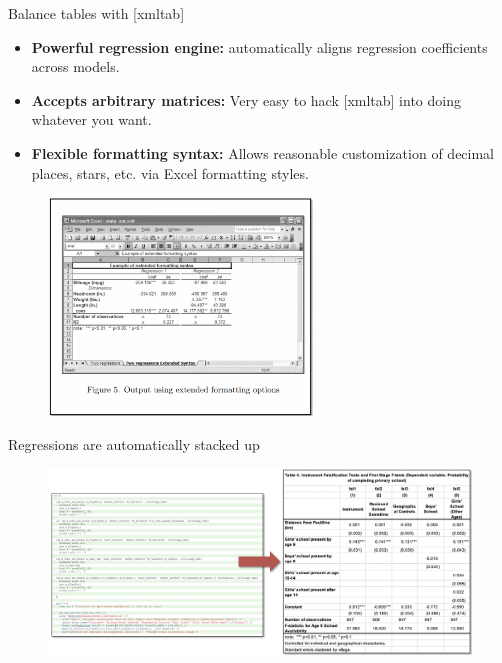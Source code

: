 \documentclass[aspectratio=169]{beamer}
\begin{document}
\begin{frame}{Balance tables with [xmltab]}
	\begin{multicols}{2}	
		
		\begin{itemize}[<default overlay specification>]
			\item<1> \textbf{Powerful regression engine:} automatically aligns regression coefficients across models.
			\item<1> \textbf{Accepts arbitrary matrices:} Very easy to hack [xmltab] into doing whatever you want. 
			\item<1> \textbf{Flexible formatting syntax:} Allows reasonable customization of decimal places, stars, etc. via Excel formatting styles.
		\end{itemize}
		
		\begin{figure}
			\centering
			\includegraphics[width=70mm]{img/Xml_tab}
		\end{figure}
		
	\end{multicols}
\end{frame}


\begin{frame}{Regressions are automatically stacked up}
	
	\begin{figure}
		\centering
		\includegraphics[width=\linewidth]{img/Regressions2}
	\end{figure}
	
\end{frame}
\end{document}
